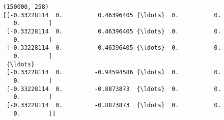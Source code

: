 \documentclass[11pt]{article}
\begin{document}
    \begin{Verbatim}[commandchars=\\\{\}]
(150000, 258)
[[-0.33228114  0.          0.46396405 {\ldots}  0.          0.
   0.        ]
 [-0.33228114  0.          0.46396405 {\ldots}  0.          0.
   0.        ]
 [-0.33228114  0.          0.46396405 {\ldots}  0.          0.
   0.        ]
 {\ldots}
 [-0.33228114  0.         -0.94594586 {\ldots}  0.          0.
   0.        ]
 [-0.33228114  0.         -0.8873873  {\ldots}  0.          0.
   0.        ]
 [-0.33228114  0.         -0.8873873  {\ldots}  0.          0.
   0.        ]]

    \end{Verbatim}


    
    
    
    
\end{document}
